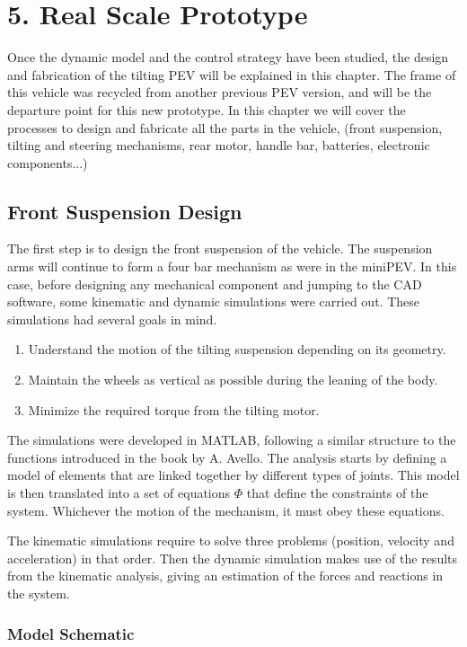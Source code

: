 \chapter{5. Real Scale Prototype}

Once the dynamic model and the control strategy have been studied, the design and fabrication of the tilting PEV will be explained in this chapter. The frame of this vehicle was recycled from another previous PEV version, and will be the departure point for this new prototype. In this chapter we will cover the processes to design and fabricate all the parts in the vehicle, (front suspension, tilting and steering mechanisms, rear motor, handle bar, batteries, electronic components...)

\section{Front Suspension Design}
The first step is to design the front suspension of the vehicle. The suspension arms will continue to form a four bar mechanism as were in the miniPEV. In this case, before designing any mechanical component and jumping to the CAD software, some kinematic and dynamic simulations were carried out. These simulations had several goals in mind.
\begin{enumerate}\itemsep -10pt
\item Understand the motion of the tilting suspension depending on its geometry.
\item Maintain the wheels as vertical as possible during the leaning of the body.
\item Minimize the required torque from the tilting motor. 
\end{enumerate}
The simulations were developed in MATLAB, following a similar structure to the functions introduced in the book by A. Avello\cite{iturriagagoitia2014teoria}. The analysis starts by defining a model of elements that are linked together by different types of joints. This model is then translated into a set of equations $\Phi$ that define the constraints of the system. Whichever the motion of the mechanism, it must obey these equations. 

\newpage
The kinematic simulations require to solve three problems (position, velocity and acceleration) in that order. Then the dynamic simulation makes use of the results from the kinematic analysis, giving an estimation of the forces and reactions in the system.

\subsection{Model Schematic}

